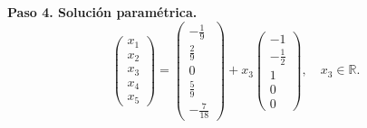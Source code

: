 \begin{prob}
\begin{enumerate}[$a)$]
\begin{myproof}
    \textbf{Paso 4. Solución paramétrica.}
    \[
    \boxed{\begin{pmatrix} x_1 \\ x_2 \\ x_3 \\ x_4 \\ x_5 \end{pmatrix} =
    \begin{pmatrix} -\frac{1}{9} \\ \frac{2}{9} \\ 0 \\ \frac{5}{9} \\ -\frac{7}{18} \end{pmatrix} +
    x_3 \begin{pmatrix} -1 \\ -\frac{1}{2} \\ 1 \\ 0 \\ 0 \end{pmatrix}}, \quad x_3 \in \mathbb{R}.
    \]
    \end{myproof}
    \end{enumerate}
\end{prob}

